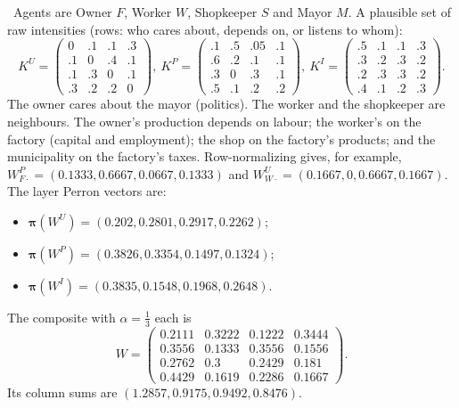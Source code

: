 \documentclass[../solutions_manual.tex]{subfiles}
\begin{document}

 \illustrative\ Agents are Owner $F$, Worker $W$, Shopkeeper $S$ and Mayor $M$. A plausible set of raw intensities (rows: who cares about, depends on, or listens to whom):
\[
K^U = \begin{pmatrix} 0 & .1 & .1 & .3\\ .1 & 0 & .4 & .1\\ .1 & .3 & 0 & .1\\ .3 & .2 & .2 & 0\end{pmatrix}\!,\
K^P = \begin{pmatrix} .1 & .5 & .05 & .1\\ .6 & .2 & .1 & .1\\ .3 & 0 & .3 & .1\\ .5 & .1 & .2 & .2\end{pmatrix}\!,\
K^I = \begin{pmatrix} .5 & .1 & .1 & .3\\ .3 & .2 & .3 & .2\\ .2 & .3 & .3 & .2\\ .4 & .1 & .2 & .3\end{pmatrix}\!.
\]
The owner cares about the mayor (politics). The worker and the shopkeeper are neighbours. The owner's production depends on labour; the worker's on the factory (capital and employment); the shop on the factory's products; and the municipality on the factory's taxes. Row-normalizing gives, for example, $W^P_{F\cdot} = (0.1333, 0.6667, 0.0667, 0.1333)$ and $W^U_{W\cdot} = (0.1667, 0, 0.6667, 0.1667)$. The layer Perron vectors are:
\begin{itemize}
\item $\boldsymbol\pi(W^U) = (0.202, 0.2801, 0.2917, 0.2262)$;
\item $\boldsymbol\pi(W^P) = (0.3826, 0.3354, 0.1497, 0.1324)$;
\item $\boldsymbol\pi(W^I) = (0.3835, 0.1548, 0.1968, 0.2648)$.
\end{itemize}

 The composite with $\alpha = \frac13$ each is
\[
W = \begin{pmatrix} 0.2111 & 0.3222 & 0.1222 & 0.3444\\ 0.3556 & 0.1333 & 0.3556 & 0.1556\\ 0.2762 & 0.3 & 0.2429 & 0.181\\ 0.4429 & 0.1619 & 0.2286 & 0.1667\end{pmatrix}.
\]
Its column sums are $(1.2857, 0.9175, 0.9492, 0.8476)$.
\end{document}
